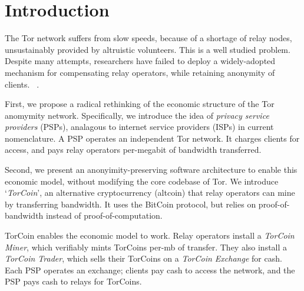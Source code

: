 \section{Introduction}

The Tor network suffers from slow speeds, because of a shortage of relay nodes, unsustainably provided by 
altruistic volunteers. This is a well studied problem. Despite many attempts, researchers have failed to deploy a widely-adopted mechanism for compensating relay operators, while retaining anonymity of clients. ~\cite{raykova-pet2008, wpes09-xpay, incentives-fc10,
ccs10-braids, acsac11-tortoise, jansen2013lira, johnson2013onions}.

First, we propose a radical rethinking of the economic structure of the Tor anomymity network. Specifically, we introduce the idea of \textit{privacy service providers} (PSPs), analagous to internet service providers (ISPs) in current nomenclature. A PSP operates an independent Tor network. It charges clients for access, and pays relay operators per-megabit of bandwidth transferred.

Second, we present an anonyimity-preserving software architecture to enable this economic model, without modifying the core codebase of Tor. We introduce `\textit{TorCoin}', an alternative cryptocurrency (altcoin) that relay operators can mine by transferring bandwidth. It uses the BitCoin protocol, but relies on proof-of-bandwidth instead of proof-of-computation.

TorCoin enables the economic model to work. Relay operators install a \textit{TorCoin Miner}, which verifiably mints TorCoins per-mb of transfer. They also install a \textit{TorCoin Trader}, which sells their TorCoins on a \textit{TorCoin Exchange} for cash. Each PSP operates an exchange; clients pay cash to access the network, and the PSP pays cash to relays for TorCoins.
